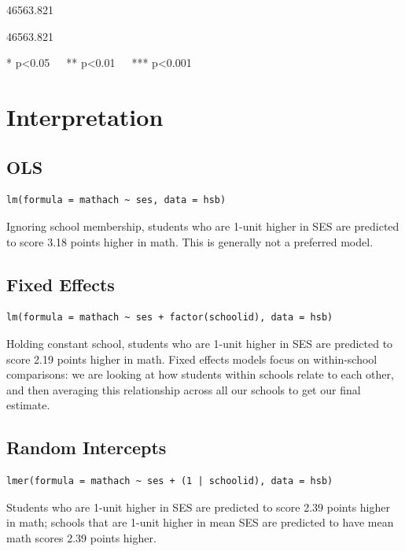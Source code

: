 \documentclass[
  letterpaper,
  DIV=11,
  numbers=noendperiod]{scrreprt}
\begin{document}
46563.821

46563.821

* p\textless0.05~~~** p\textless0.01~~~*** p\textless0.001

\hypertarget{interpretation}{%
\section{Interpretation}\label{interpretation}}

\hypertarget{ols}{%
\subsection{OLS}\label{ols}}

\begin{verbatim}
lm(formula = mathach ~ ses, data = hsb)
\end{verbatim}

Ignoring school membership, students who are 1-unit higher in SES are
predicted to score 3.18 points higher in math. This is generally not a
preferred model.

\hypertarget{fixed-effects}{%
\subsection{Fixed Effects}\label{fixed-effects}}

\begin{verbatim}
lm(formula = mathach ~ ses + factor(schoolid), data = hsb)
\end{verbatim}

Holding constant school, students who are 1-unit higher in SES are
predicted to score 2.19 points higher in math. Fixed effects models
focus on within-school comparisons: we are looking at how students
within schools relate to each other, and then averaging this
relationship across all our schools to get our final estimate.

\hypertarget{random-intercepts}{%
\subsection{Random Intercepts}\label{random-intercepts}}

\begin{verbatim}
lmer(formula = mathach ~ ses + (1 | schoolid), data = hsb)
\end{verbatim}

Students who are 1-unit higher in SES are predicted to score 2.39 points
higher in math; schools that are 1-unit higher in mean SES are predicted
to have mean math scores 2.39 points higher.
\end{document}
